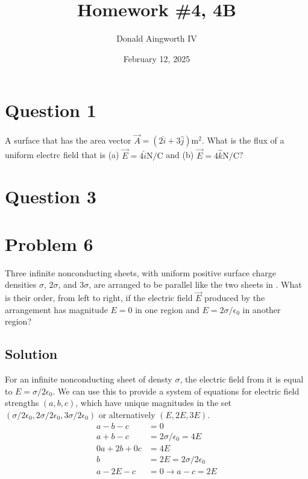 \documentclass[12pt]{article}
\title{Homework \#4, 4B}
\author{Donald Aingworth IV}
\date{February 12, 2025}
\begin{document}

\maketitle

\section{Question 1}
A surface that has the area vector $\vec{A} = \left(2\hat{i} + 3\hat{j}\right) \unit{\meter^2}$. What is the flux of a uniform electrc field that is (a) $\vec{E} = 4\hat{i} \unit{\newton/\coulomb}$ and (b) $\vec{E} = 4\hat{k} \unit{\newton/\coulomb}$?

\section{Question 3}

\pagebreak
\section{Problem 6}
Three infinite nonconducting sheets, with uniform positive surface charge densities $\sigma$, $2\sigma$, and $3\sigma$, are arranged to be parallel like the two sheets in . What is their order, from left to right, if the electric field $\vec{E}$ produced by the arrangement has magnitude $E = 0$ in one region and $E = 2\sigma/\epsilon_0$ in another region?

\subsection*{Solution}
For an infinite nonconducting sheet of densty $\sigma$, the electric field from it is equal to $E = \sigma/2\epsilon_0$. We can use this to provide a system of equations for electric field strengths $(a, b, c)$, which have unique magnitudes in the set $(\sigma/2\epsilon_0, 2\sigma/2\epsilon_0, 3\sigma/2\epsilon_0)$ or alternatively $(E, 2E, 3E)$. 
\begin{align*}
    a - b - c &= 0\\
    a + b - c &= 2\sigma/\epsilon_0 = 4E\\
    0a + 2b + 0c &= 4E\\
    b &= 2E = 2\sigma/2\epsilon_0\\
    a - 2E - c &= 0 \rightarrow a - c = 2E
\end{align*}
\end{document}
